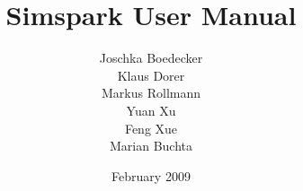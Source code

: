 

\author{Joschka Boedecker \\ Klaus Dorer \\ Markus Rollmann \\ Yuan Xu
\\ Feng Xue \\ Marian Buchta}
\title{Simspark User Manual}

\date{February 2009}



\maketitle
\cleardoublepage
\pagestyle{fancy}


\setlength{\headheight}{14pt}
\setlength{\parindent}{0.7cm}

\frontmatter
\tableofcontents
\mainmatter












\backmatter




\printindex 


